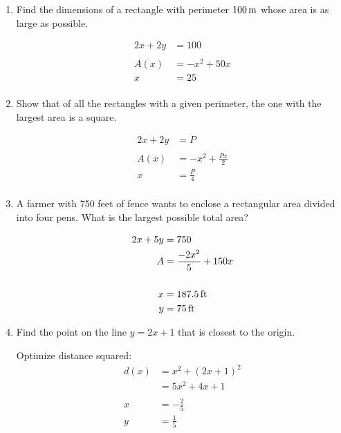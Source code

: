 \documentclass{exam}
\begin{document}
\begin{enumerate}
  \item Find the dimensions of a rectangle with perimeter $\unit[100]{m}$ whose area is as large as possible.

    \begin{solution}
      \begin{align*}
        2x + 2y &= 100 \\
        \\
        A(x) &= -x^2 + 50x \\
        x &= 25 \\
      \end{align*}
    \end{solution}

  \pagebreak

  \item Show that of all the rectangles with a given perimeter, the one with the largest area is a square.

    \begin{solution}
      \begin{align*}
        2x + 2y &= P \\
        \\
        A(x) &= -x^2 + \frac{Px}{2} \\
        x &= \frac{P}{4} \\
      \end{align*}
    \end{solution}

  \item A farmer with 750 feet of fence wants to enclose a rectangular area divided into four pens.  What is the largest
    possible total area?

    \begin{solution}
      \begin{align*}
        2x + 5y &= 750 \\
        A       &= \frac{-2x^2}{5} + 150x \\
        \\
        x       &= \unit[187.5]{ft} \\
        y       &= \unit[75]{ft} \\
      \end{align*}
    \end{solution}

  \item Find the point on the line $y = 2x + 1$ that is closest to the origin.

    \begin{solution}
      Optimize distance squared:
      \begin{align*}
        d(x) &= x^2 + (2x + 1)^2 \\
        &= 5x^2 + 4x + 1 \\
        \\
        x &= - \frac{2}{5} \\
        y &= \frac{1}{5} \\
      \end{align*}
    \end{solution}


\end{enumerate}
\end{document}
